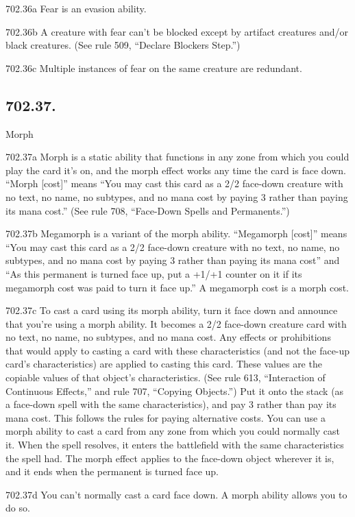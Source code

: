 702.36a Fear is an evasion ability.

702.36b A creature with fear can’t be blocked except by artifact creatures and/or black creatures. (See rule 509, “Declare Blockers Step.”)

702.36c Multiple instances of fear on the same creature are redundant.

\subsection*{702.37.}
Morph

702.37a Morph is a static ability that functions in any zone from which you could play the card it’s on, and the morph effect works any time the card is face down. “Morph [cost]” means “You may cast this card as a 2/2 face-down creature with no text, no name, no subtypes, and no mana cost by paying {3} rather than paying its mana cost.” (See rule 708, “Face-Down Spells and Permanents.”)

702.37b Megamorph is a variant of the morph ability. “Megamorph [cost]” means “You may cast this card as a 2/2 face-down creature with no text, no name, no subtypes, and no mana cost by paying {3} rather than paying its mana cost” and “As this permanent is turned face up, put a +1/+1 counter on it if its megamorph cost was paid to turn it face up.” A megamorph cost is a morph cost.

702.37c To cast a card using its morph ability, turn it face down and announce that you’re using a morph ability. It becomes a 2/2 face-down creature card with no text, no name, no subtypes, and no mana cost. Any effects or prohibitions that would apply to casting a card with these characteristics (and not the face-up card’s characteristics) are applied to casting this card. These values are the copiable values of that object’s characteristics. (See rule 613, “Interaction of Continuous Effects,” and rule 707, “Copying Objects.”) Put it onto the stack (as a face-down spell with the same characteristics), and pay {3} rather than pay its mana cost. This follows the rules for paying alternative costs. You can use a morph ability to cast a card from any zone from which you could normally cast it. When the spell resolves, it enters the battlefield with the same characteristics the spell had. The morph effect applies to the face-down object wherever it is, and it ends when the permanent is turned face up.

702.37d You can’t normally cast a card face down. A morph ability allows you to do so.

